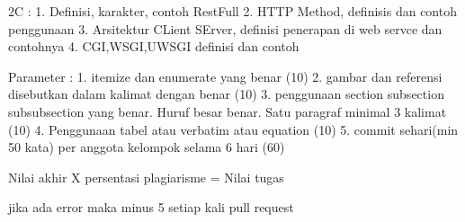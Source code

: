 2C :
1. Definisi, karakter, contoh RestFull
2. HTTP Method, definisis dan contoh penggunaan
3. Arsitektur CLient SErver, definisi penerapan di web servce dan contohnya
4. CGI,WSGI,UWSGI definisi dan contoh



Parameter :
1. itemize dan enumerate yang benar (10)
2. gambar dan referensi disebutkan dalam kalimat dengan benar (10)
3. penggunaan section subsection subsubsection yang benar. Huruf besar benar. Satu paragraf minimal 3 kalimat (10)
4. Penggunaan tabel atau verbatim atau equation (10)
5. commit sehari(min 50 kata) per anggota kelompok selama 6 hari (60)

Nilai akhir X persentasi plagiarisme = Nilai tugas


jika ada error maka minus 5 setiap kali pull request